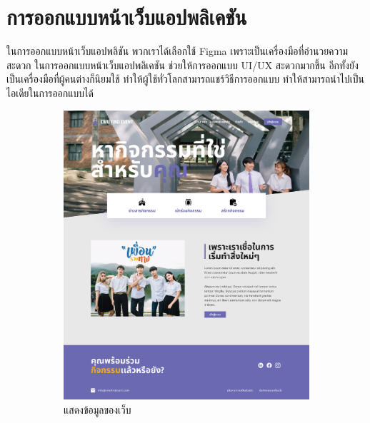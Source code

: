 \section{การออกแบบหน้าเว็บแอปพลิเคชัน}
ในการออกแบบหน้าเว็บแอปพลิชัน พวกเราได้เลือกใช้ Figma เพราะเป็นเครื่องมือที่อำนวยความสะดวก ในการออกแบบหน้าเว็บแอปพลิเคชัน ช่วยให้การออกแบบ UI/UX สะดวกมากขึ้น อีกทั้งยังเป็นเครื่องมือที่ผู้คนต่างก็นิยมใช้
ทำให้ผู้ใช้ทั่วโลกสามารถแชร์วิธีการออกแบบ ทำให้สามารถนำไปเป็นไอเดียในการออกแบบได้ 
\begin{figure}[h]
  \centering
  \begin{subfigure}[b]{0.4\linewidth}
    \includegraphics[width=\linewidth]{image/Figma-design/Main-not-login.png}
    \caption{แสดงข้อมูลของเว็บ}
  \end{subfigure}
  \hfill
  \begin{subfigure}[b]{0.4\linewidth}

\end{subfigure}
\end{figure}
